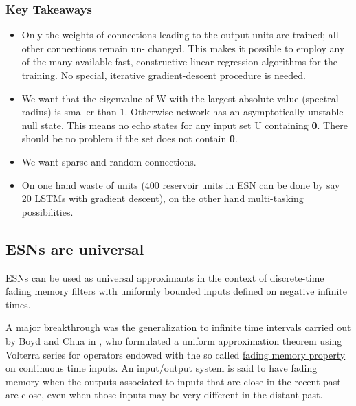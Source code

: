 \documentclass{article}
\begin{document}
\subsubsection{Key Takeaways}
\begin{itemize}
    \item Only the weights of connections leading to the output units are trained; all other connections remain un- changed. This makes it possible to employ any of the many available fast, constructive linear regression algorithms for the training. No special, iterative gradient-descent procedure is needed.
    
    \item We want that the eigenvalue of W with the largest absolute value (spectral radius) is smaller than 1. Otherwise network has an asymptotically unstable null state. This means no echo states for any input set U containing \textbf{0}. There should be no problem if the set does not contain \textbf{0}.
    \item We want sparse and random connections.
    
    \item On one hand waste of units (400 reservoir units in ESN can be done by say 20 LSTMs with gradient descent), on the other hand multi-tasking possibilities.
\end{itemize}

\subsection{ESNs are universal \cite{ortega,grigoryeva2018universal}}
ESNs can be used as universal approximants in the context of discrete-time fading memory filters with uniformly bounded inputs defined on negative infinite times. 

A major breakthrough was the generalization to infinite time intervals carried out by Boyd and Chua in \cite{fadingmem}, who formulated a uniform approximation theorem using Volterra series for operators endowed with the so called \underline{fading memory property} on continuous time inputs. An input/output system is said to have fading memory when the outputs associated to inputs that are close in the recent past are close, even when those inputs may be very different in the distant past.
\end{document}
